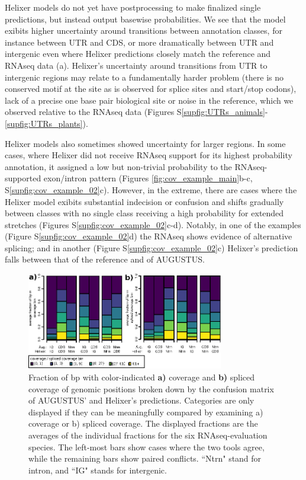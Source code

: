 \documentclass{bioinfo}
\newcounter{supfig}
\begin{document}
Helixer models do not yet have postprocessing
to make finalized single predictions, but instead output basewise probabilities.
We see that the model exibits higher uncertainty around transitions between annotation 
classes, for instance between UTR and CDS, or more dramatically between UTR and 
intergenic even where Helixer predictions closely match the reference and RNAseq data (a). 
Helixer's uncertainty around transitions from UTR to intergenic regions may relate to a
fundamentally harder problem (there is no conserved motif at the site as is observed
for splice sites and start/stop codons), lack of a precise one 
base pair biological site \citep{carninci2006genome,hon2013quantification}
or noise in the reference, which we observed relative to the RNAseq data 
(Figures S\ref{supfig:UTRs_animals}-\ref{supfig:UTRs_plants}). %

Helixer models also sometimes showed uncertainty for larger regions.
In some cases, where Helixer did not receive RNAseq support for its highest probability
annotation, it assigned a low but non-trivial probability to the RNAseq-supported 
exon/intron pattern (Figures \ref{fig:cov_example_main}b-c, S\ref{supfig:cov_example_02}c). However, in the extreme,
there are cases where the Helixer model exibits substantial indecision or confusion 
and shifts gradually between classes with no single class receiving a high probability 
for extended stretches (Figures S\ref{supfig:cov_example_02}c-d). 
Notably, in one of the examples (Figure S\ref{supfig:cov_example_02}d)
the RNAseq shows evidence of alternative splicing; 
and in another (Figure S\ref{supfig:cov_example_02}c) Helixer's
prediction falls between that of the reference and of AUGUSTUS.

\begin{figure}[hbt]
\label{fig:average_vs_augustus}
\includegraphics[width=8.6cm]{images/cov_examples/average_vs_augustus} 
\caption{Fraction of bp with color-indicated {\bf a)} coverage and {\bf b)} spliced coverage of genomic positions 
broken down by the confusion matrix of AUGUSTUS' and Helixer's predictions. Categories 
are only displayed if they can be meaningfully compared by examining a) coverage or b) spliced
coverage. The displayed fractions are the averages of the individual fractions for the 
six RNAseq-evaluation species. The left-most bars show cases where the two tools agree, 
while the remaining bars show paired conflicts. ``Ntrn" stand
for intron, and ``IG" stands for intergenic.}
\end{figure}
\end{document}
